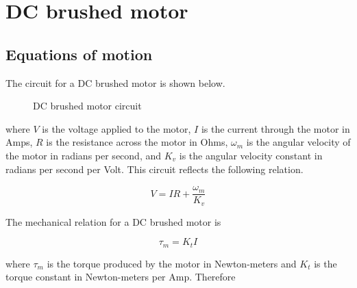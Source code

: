 \section{DC brushed motor}

\subsection{Equations of motion}

The circuit for a DC brushed motor is shown below.

\begin{figure}[H]
  \centering


  \caption{DC brushed motor circuit}
  \label{fig:dc_motor_circuit}
\end{figure}

\noindent where $V$ is the voltage applied to the motor, $I$ is the current
through the motor in Amps, $R$ is the resistance across the motor in Ohms,
$\omega_m$ is the angular velocity of the motor in radians per second, and
$K_v$ is the angular velocity constant in radians per second per Volt. This
circuit reflects the following relation.

\begin{equation}
  V = IR + \frac{\omega_m}{K_v} \label{eq:motor_V}
\end{equation}

The mechanical relation for a DC brushed motor is

\begin{equation}
  \tau_m = K_t I \label{eq:motor_tau_m}
\end{equation}

\noindent where $\tau_m$ is the torque produced by the motor in Newton-meters
and $K_t$ is the torque constant in Newton-meters per Amp. Therefore

